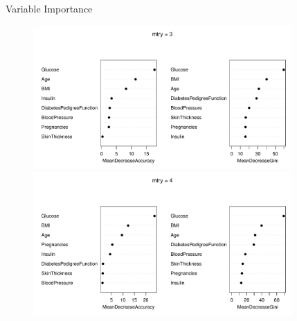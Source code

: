 
\begin{frame}{Variable Importance}

\begin{figure}
	\hspace*{-1.5em}\includegraphics[width=0.88\textwidth, height=0.38\columnwidth]{slide/Figures/forest/diabete_var_imp3.pdf}
	\hspace*{-1.5em}\includegraphics[width=0.88\textwidth, height=0.38\columnwidth]{slide/Figures/forest/diabete_var_imp4.pdf}
\end{figure}
\end{frame}

